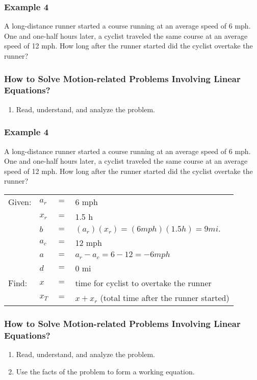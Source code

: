 \documentclass[14pt]{beamer}
\begin{document}
    \begin{frame}
    	\frametitle{Example 4}
    	A long-distance runner started a course running at an average speed of 6 mph.
    	One and one-half hours later, a cyclist traveled the same course at an average
    	speed of 12 mph. How long after the runner started did the cyclist overtake the
    	runner?
    \end{frame}
    
    \begin{frame}
    	\frametitle{How  to Solve Motion-related Problems Involving Linear Equations?}
    	
    	\begin{enumerate}  
    		\item Read, understand, and analyze the problem. 
    	\end{enumerate}  
    \end{frame}
    
    \begin{frame}
    	\frametitle{Example 4}
    	\small A long-distance runner started a course running at an average speed of 6 mph.
One and one-half hours later, a cyclist traveled the same course at an average
speed of 12 mph. How long after the runner started did the cyclist overtake the
runner?
    	  
    	\vone
    	\normalsize
    	\begin{tabular}{llll}
    		Given: & \pause $ a_r $ & $ = $ & 6 mph \\
    		& \pause $ x_r $ & $ = $ & 1.5 h \\
    		& \pause $ b $ & $ = $ & $ (a_r)(x_r) = (6 mph)(1.5 h) = 9 mi. $ \\
    		& \pause $ a_c $ & $ = $ & 12 mph \\
    		& \pause $ a $ & $ = $ & $ a_r - a_c  = 6 - 12 = -6 mph $\\
    		& \pause $ d $ & $ = $ & 0 mi \\
    		\pause Find: & $ x $ & $ = $ & \small time for cyclist to overtake the runner \normalsize \\  
    		\pause & $ x_T $ & $ = $ & $ x + x_r $ \footnotesize (total time after the runner started)  \\  
    	\end{tabular}
    \end{frame}  
    
    \begin{frame}
    	\frametitle{How  to Solve Motion-related Problems Involving Linear Equations?}
    	
    	\begin{enumerate}  
    		\item Read, understand, and analyze the problem. 
    		\item Use the facts of the problem to form a working equation.
    	\end{enumerate}  
    \end{frame}
    
\end{document}

